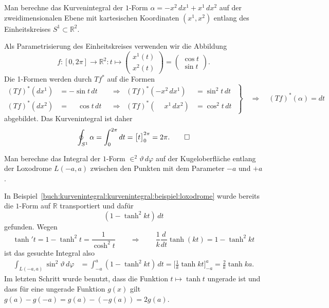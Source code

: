\begin{beispiel}
Man berechne das Kurvenintegral der $1$-Form $\alpha=-x^2\,dx^1+x^1\,dx^2$ auf
der zweidimensionalen Ebene mit kartesischen Koordinaten $(x^1,x^2)$
entlang des Einheitskreises $S^1\subset\mathbb{R}^2$.
\smallskip

\noindent
Als Parametrisierung des Einheitskreises verwenden wir die Abbildung
\[
f
\colon
[0,2\pi]
\to
\mathbb{R}^2
:
t
\mapsto
\begin{pmatrix} x^1(t)\\x^2(t)\end{pmatrix}
=
\begin{pmatrix} \cos t\\\sin t\end{pmatrix}.
\]
Die 1-Formen werden durch $Tf^*$ auf die Formen
\[
\left.
\begin{aligned}
(Tf)^*(dx^1) &= -\sin t\,dt           &&\Rightarrow& (Tf)^*(-x^2\,dx^1) &= \sin^2 t\,dt\\
(Tf)^*(dx^2) &= \phantom{-}\cos t\,dt &&\Rightarrow& (Tf)^*(\phantom{-} x^1\,dx^2) &= \cos^2 t\,dt
\end{aligned}
\;
\right\}
\quad\Rightarrow\quad
(Tf)^*(\alpha)
=
dt
\]
abgebildet.
Das Kurvenintegral ist daher
\[
\oint_{S^1} \alpha
=
\int_0^{2\pi} dt
=
\bigl[
t
\bigr]_0^{2\pi}
=
2\pi.
\qedhere
\]
\end{beispiel}

\begin{beispiel}
Man berechne das Integral der $1$-Form $\in^2\vartheta\,d\varphi$ auf
der Kugeloberfläche entlang der Loxodrome $L(-a,a)$ zwischen den Punkten
mit dem Parameter $-a$ und $+a$.
\smallskip

\noindent
In Beispiel~\ref{buch:kurvenintegral:kurvenintegral:beispiel:loxodrome}
wurde bereits die $1$-Form auf $\mathbb{R}$ transportiert und dafür
\[
(1-\tanh^2 kt)\,dt
\]
gefunden.
Wegen
\[
\tanh' t
=
1-\tanh^2 t
=
\frac{1}{\cosh^2 t}
\qquad\Rightarrow\qquad
\frac{1}{k}
\frac{d}{dt}
\tanh(kt)
=
1-\tanh^2 kt
\]
ist das gesuchte Integral also
\begin{align*}
\int_{L(-a,a)} \sin^2\vartheta\,d\varphi
&=
\int_{-a}^a
(1-\tanh^2 kt)
\,dt
=
\biggl[
\frac{1}k
\tanh kt
\biggr]_{-a}^a
=\frac{2}{k} \tanh ka.
\end{align*}
Im letzten Schritt wurde benutzt, dass die Funktion $t\mapsto \tanh t$
ungerade ist und dass für eine ungerade Funktion $g(x)$ gilt
$g(a)-g(-a)= g(a)-(-g(a))=2g(a)$.
\end{beispiel}

